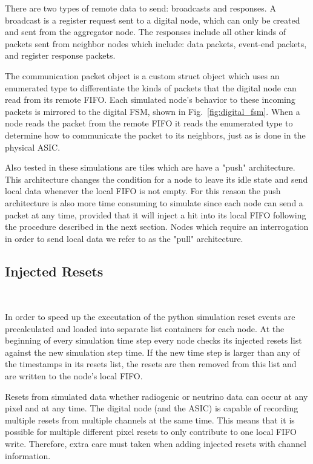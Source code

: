 There are two types of remote data to send: broadcasts and responses.
A broadcast is a register request sent to a digital node, which can only be created and sent from the aggregator node.
The responses include all other kinds of packets sent from neighbor nodes which include: data packets, event-end packets, and register response packets.

The communication packet object is a custom struct object which uses an enumerated type to differentiate the kinds of packets that the digital node can read from its remote FIFO.
Each simulated node's behavior to these incoming packets is mirrored to the digital FSM, shown in Fig.~\ref{fig:digital_fsm}.
When a node reads the packet from the remote FIFO it reads the enumerated type to determine how to communicate the packet to its neighbors, just as is done in the physical ASIC.

Also tested in these simulations are tiles which are have a "push" architecture.
This architecture changes the condition for a node to leave its idle state and send local data whenever the local FIFO is not empty.
For this reason the push architecture is also more time consuming to simulate since each node can send a packet at any time, provided that it will inject a hit into its local FIFO following the procedure described in the next section.
Nodes which require an interrogation in order to send local data we refer to as the "pull" architecture.

\subsection{Injected Resets}~\label{sec:hits}

In order to speed up the executation of the python simulation reset events are precalculated and loaded into separate list containers for each node.
At the beginning of every simulation time step every node checks its injected resets list against the new simulation step time.
If the new time step is larger than any of the timestamps in its resets list, the resets are then removed from this list and are written to the node's local FIFO.

Resets from simulated data whether radiogenic or neutrino data can occur at any pixel and at any time.
The digital node (and the ASIC) is capable of recording multiple resets from multiple channels at the same time.
This means that it is possible for multiple different pixel resets to only contribute to one local FIFO write.
Therefore, extra care must taken when adding injected resets with channel information.

